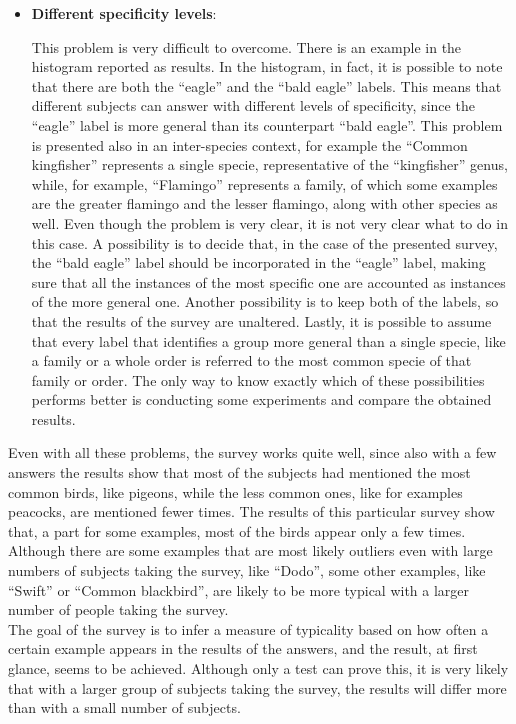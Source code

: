 \documentclass[conference]{IEEEtran}
\begin{document}
\begin{itemize}
			\item \textbf{Different specificity levels}:
			
				This problem is very difficult to overcome. There is an example in the histogram reported as results. In the histogram, in fact, it is possible to note that there are both the ``eagle'' and 
				the ``bald eagle'' labels. This means that different subjects can answer with different levels of specificity, since the ``eagle'' label is more general than its counterpart ``bald eagle''. 
				This problem is presented also in an inter-species context, for example the ``Common kingfisher'' represents a single specie, representative of the ``kingfisher'' genus, while, for example, 
				``Flamingo'' represents a family, of which some examples are the greater flamingo and the lesser flamingo, along with other species as well. 
				Even though the problem is very clear, it is not very clear what to do in this case. A possibility is to decide that, in the case of the presented survey, 
				the ``bald eagle'' label should be incorporated in the ``eagle'' 
				label, making sure that all the instances of the most specific one are accounted as instances of the more general one. Another possibility is to keep both of the labels, so that the results of 
				the survey are unaltered. Lastly, it is possible to assume that every label that identifies a group more general than a single specie, like a family or a whole order is referred to the most 
				common specie of that family or order. The only way to know exactly which of these possibilities performs better is conducting some experiments and compare the obtained results.
		
		\end{itemize}
		
			\noindent Even with all these problems, the survey works quite well, since also with a few answers the results show that most of the subjects had mentioned the most common birds, like pigeons, while the 
			less common ones, like for examples peacocks, are mentioned fewer times. The results of this particular survey show that, a part for some examples, most of the birds appear only a few times. Although there 
			are some examples that are most likely outliers even with large numbers of subjects taking the survey, like ``Dodo'', some other examples, like ``Swift'' or ``Common blackbird'', 
			are likely to be more typical with a larger number of people taking the survey.\\
			The goal of the survey is to infer a measure of typicality based on how often a certain example appears in the results of the answers, and the result, at first glance, seems to be achieved. Although only 
			a test can prove this, it is very likely that with a larger group of subjects taking the survey, the results will differ more than with a small number of subjects. 
		
\end{document}
